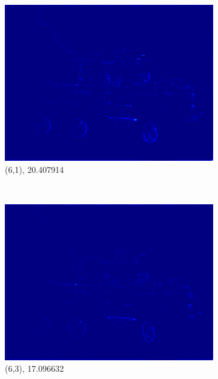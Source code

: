 \documentclass[11pt,a4paper,titlepage]{article}
\begin{document}
\begin{figure}
\begin{subfigure}[t]{0.31\textwidth}
		\includegraphics[width=\textwidth]{results/tiles_legotruck_6x6x480x640_480x640x5_tiling_4x6x200x200_overlap_0.5/MSE_for_view_(6,1).png}
		\caption{(6,1), 20.407914}
	\end{subfigure}%
	~
	\begin{subfigure}[t]{0.31\textwidth}
		\includegraphics[width=\textwidth]{results/tiles_legotruck_6x6x480x640_480x640x5_tiling_4x6x200x200_overlap_0.5/MSE_for_view_(6,3).png}
		\caption{(6,3), 17.096632}
	\end{subfigure}%
	~
	\begin{subfigure}[t]{0.31\textwidth}

\end{subfigure}
\end{figure}
\end{document}
